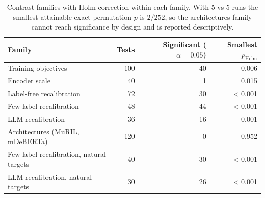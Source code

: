 \begin{table}[t]
\centering
\small
\caption{Contrast families with Holm correction within each family. With 5 vs 5 runs the smallest attainable exact permutation $p$ is $2/252$, so the architectures family cannot reach significance by design and is reported descriptively.}
\label{tab:contrast-families-holm}
\begin{tabular}{lrrr}
\toprule
Family & Tests & Significant ($\alpha = 0.05$) & Smallest $p_{\mathrm{Holm}}$ \\
\midrule
Training objectives & 100 & 40 & 0.006 \\
Encoder scale & 40 & 1 & 0.015 \\
Label-free recalibration & 72 & 30 & $<$0.001 \\
Few-label recalibration & 48 & 44 & $<$0.001 \\
LLM recalibration & 36 & 16 & 0.001 \\
Architectures (MuRIL, mDeBERTa) & 120 & 0 & 0.952 \\
Few-label recalibration, natural targets & 40 & 30 & $<$0.001 \\
LLM recalibration, natural targets & 30 & 26 & $<$0.001 \\
\bottomrule
\end{tabular}
\end{table}
